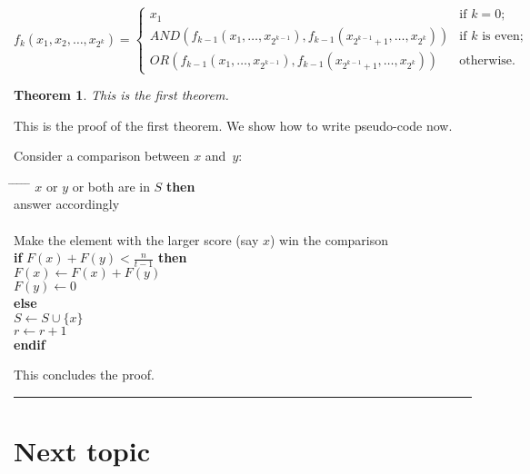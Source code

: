 \documentclass[twoside]{article}
\newcounter{lecnum}
\newtheorem{theorem}{Theorem}[lecnum]
\newenvironment{proof}{{\bf Proof:}}{\hfill\rule{2mm}{2mm}}
\begin{document}
\[ f_k(x_1, x_2, \ldots, x_{2^k}) = \left\{ \begin{array}{ll}

	x_1 & \mbox{if $k = 0$;} \\

	AND(f_{k-1}(x_1, \ldots, x_{2^{k-1}}),
	   f_{k-1}(x_{2^{k-1} + 1}, \ldots, x_{2^k}))
	 & \mbox{if $k$ is even;} \\

	OR(f_{k-1}(x_1, \ldots, x_{2^{k-1}}),
	   f_{k-1}(x_{2^{k-1} + 1}, \ldots, x_{2^k}))	
	& \mbox{otherwise.} 
	\end{array}
	\right. \]

\begin{theorem}
This is the first theorem.
\end{theorem}

\begin{proof}
This is the proof of the first theorem. We show how to write pseudo-code now.

Consider a comparison between $x$ and~$y$:
\begin{tabbing}
\hspace*{.25in} \= \hspace*{.25in} \= \hspace*{.25in} \= \hspace*{.25in} \= \hspace*{.25in} \=\kill
{} $x$ or $y$ or both are in $S$ {\bf then } \\
\>\> answer accordingly \\
 \\
\>\>    Make the element with the larger score (say $x$) win the comparison \\
\>\> {\bf if} $F(x) + F(y) < \frac{n}{t-1}$ {\bf then} \\%
\>\>\> $F(x) \leftarrow F(x) + F(y)$ \\
\>\>\> $F(y) \leftarrow 0$ \\
\>\> {\bf else}  \\
\>\>\> $S \leftarrow S \cup \{ x \} $ \\
\>\>\> $r \leftarrow r+1$ \\
\>\> {\bf endif} \\
\end{tabbing}

This concludes the proof.
\end{proof}


\section{Next topic}
\end{document}
